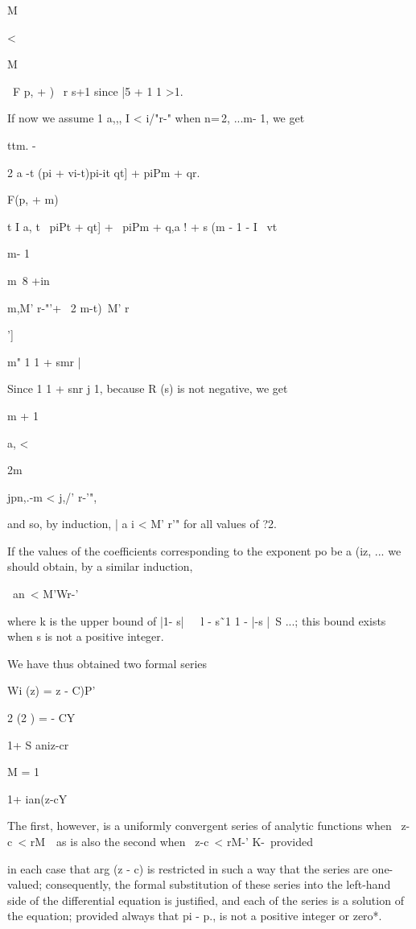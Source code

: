 M

<

M

\ F p, + ) \ r s+1 since |5 + 1 1 >1.

If now we assume 1 a,,, I < i/"r-" when n=\,2, ...m- 1, we get

ttm. -

2 a -t (pi + vi-t)pi-it qt] + piPm + qr.

F(p, + m)

t I a, t \ piPt + qt] + \ piPm + q,a ! + s (m - 1 - I \ vt

m- 1

m\ 8 +in\

m,M' r-"'+ \ 2 m-t)\ M' r

']

m" 1 1 + smr |

Since 1 1 + snr j 1, because R (s) is not negative, we get

m + 1

a, <

2m

jpn,.-m < j,/' r-'",

and so, by induction, | a i < M' r'" for all values of ?2.

If the values of the coefficients corresponding to the exponent po be
a (iz, ... we should obtain, by a similar induction,

\ an\ < M'Wr-'\

where k is the upper bound of |1- s|~\ \ l - s\~\ 1 1 - |-s |~S ...;
this bound exists when s is not a positive integer.

We have thus obtained two formal series

Wi (z) = z - C)P'

 2 (2 ) = - CY

1+ S aniz-cr

M = 1

1+ ian(z-cY

The first, however, is a uniformly convergent series of analytic
functions when \ z-c\ < rM~\ as is also the second when \ z-c\ < rM-'
K-\ provided

%
%

in each case that arg (z - c) is restricted in such a way that the
series are one-valued; consequently, the formal substitution of these
series into the left-hand side of the differential equation is
justified, and each of the series is a solution of the equation;
provided always that pi - p., is not a positive integer or zero*.


